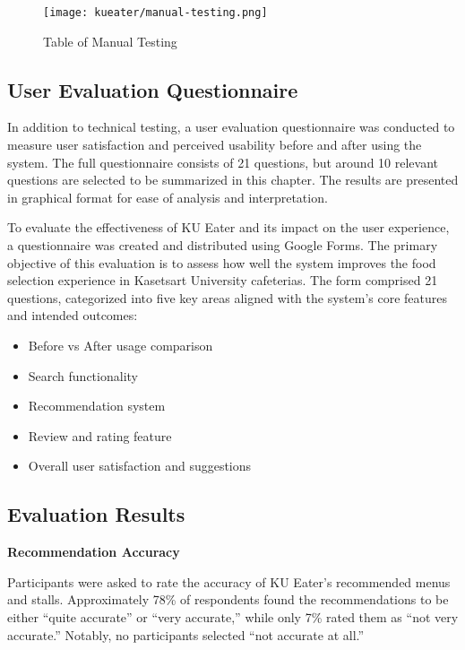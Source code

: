 \begin{figure}[h!]
    \centering
    \texttt{[image: kueater/manual-testing.png]}
    \caption{Table of Manual Testing}
    \label{fig:manual-testing}
\end{figure}

\subsection{User Evaluation Questionnaire}
\label{subsection:questionnaire}
In addition to technical testing, a user evaluation questionnaire was conducted to measure user satisfaction and perceived usability before and after using the system. The full questionnaire consists of 21 questions, but around 10 relevant questions are selected to be summarized in this chapter. The results are presented in graphical format for ease of analysis and interpretation.

To evaluate the effectiveness of KU Eater and its impact on the user experience, a questionnaire was created and distributed using Google Forms. The primary objective of this evaluation is to assess how well the system improves the food selection experience in Kasetsart University cafeterias. The form comprised 21 questions, categorized into five key areas aligned with the system's core features and intended outcomes:

\begin{itemize}[leftmargin=80pt]
    \item Before vs After usage comparison
    \item Search functionality
    \item Recommendation system
    \item Review and rating feature
    \item Overall user satisfaction and suggestions
\end{itemize}

\subsection{Evaluation Results}
\label{subsection:evaluation-results}

\textbf{Recommendation Accuracy}

Participants were asked to rate the accuracy of KU Eater's recommended menus and stalls. Approximately 78\% of respondents found the
recommendations to be either “quite accurate” or “very accurate,” while only 7\% rated 
them as “not very accurate.” Notably, no participants selected “not accurate at all.”

